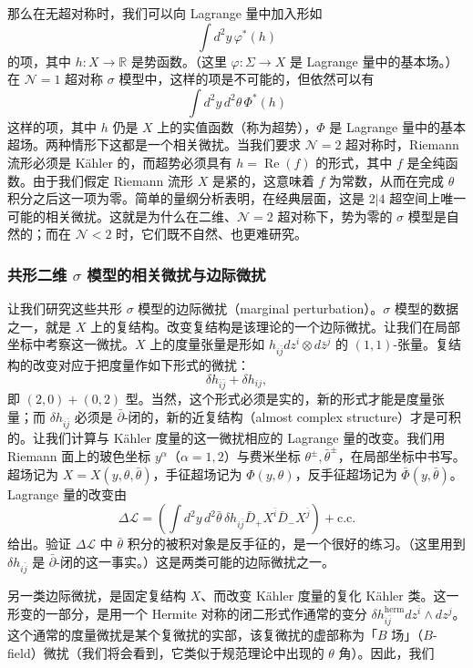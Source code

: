那么在无超对称时，我们可以向 Lagrange 量中加入形如
\[
\int d^2y\,\varphi^*(h)
\]
的项，其中 $h:X\to\mathbb{R}$ 是势函数。（这里 $\varphi:\Sigma\to X$ 是 Lagrange 量中的基本场。）在 $\mathcal{N}=1$ 超对称 $\sigma$ 模型中，这样的项是不可能的，但依然可以有
\[
\int d^2y\,d^2\theta\,\Phi^*(h)
\]
这样的项，其中 $h$ 仍是 $X$ 上的实值函数（称为超势），$\Phi$ 是 Lagrange 量中的基本超场。两种情形下这都是一个相关微扰。当我们要求 $\mathcal{N}=2$ 超对称时，Riemann 流形必须是 Kähler 的，而超势必须具有 $h=\operatorname{Re}(f)$ 的形式，其中 $f$ 是全纯函数。由于我们假定 Riemann 流形 $X$ 是紧的，这意味着 $f$ 为常数，从而在完成 $\theta$ 积分之后这一项为零。简单的量纲分析表明，在经典层面，这是 $2|4$ 超空间上唯一可能的相关微扰。这就是为什么在二维、$\mathcal{N}=2$ 超对称下，势为零的 $\sigma$ 模型是自然的；而在 $\mathcal{N}<2$ 时，它们既不自然、也更难研究。

\subsubsection{共形二维 $\sigma$ 模型的相关微扰与边际微扰}

让我们研究这些共形 $\sigma$ 模型的边际微扰（marginal perturbation）。$\sigma$ 模型的数据之一，就是 $X$ 上的复结构。改变复结构是该理论的一个边际微扰。让我们在局部坐标中考察这一微扰。$X$ 上的度量张量是形如 $h_{i\bar j}dz^i\otimes d\bar z^j$ 的 $(1,1)$-张量。复结构的改变对应于把度量作如下形式的微扰：
\[
\delta h_{\bar i\bar j}+\delta h_{ij},
\]
即 $(2,0)+(0,2)$ 型。当然，这个形式必须是实的，新的形式才能是度量张量；而 $\delta h_{i\bar j}$ 必须是 $\bar\partial$-闭的，新的近复结构（almost complex structure）才是可积的。让我们计算与 Kähler 度量的这一微扰相应的 Lagrange 量的改变。我们用 Riemann 面上的玻色坐标 $y^\alpha$（$\alpha=1,2$）与费米坐标 $\theta^\pm,\bar\theta^\pm$，在局部坐标中书写。超场记为 $X=X(y,\theta,\bar\theta)$，手征超场记为 $\Phi(y,\theta)$，反手征超场记为 $\bar\Phi(y,\bar\theta)$。Lagrange 量的改变由
\[
\Delta\mathcal{L}=\left(\int d^2y\,d^2\bar\theta\,\delta h_{i\bar j}\bar D_+X^{\bar i}\bar D_-X^{\bar j}\right)+\text{c.c.}
\]
给出。验证 $\Delta\mathcal{L}$ 中 $\bar\theta$ 积分的被积对象是反手征的，是一个很好的练习。（这里用到 $\delta h_{i\bar j}$ 是 $\bar\partial$-闭的这一事实。）这是两类可能的边际微扰之一。

另一类边际微扰，是固定复结构 $X$、而改变 Kähler 度量的复化 Kähler 类。这一形变的一部分，是用一个 Hermite 对称的闭二形式作通常的变分 $\delta h^{\mathrm{herm}}_{i\bar j}dz^{\bar i}\wedge dz^j$。这个通常的度量微扰是某个复微扰的实部，该复微扰的虚部称为「$B$ 场」（$B$-field）微扰（我们将会看到，它类似于规范理论中出现的 $\theta$ 角）。因此，我们

